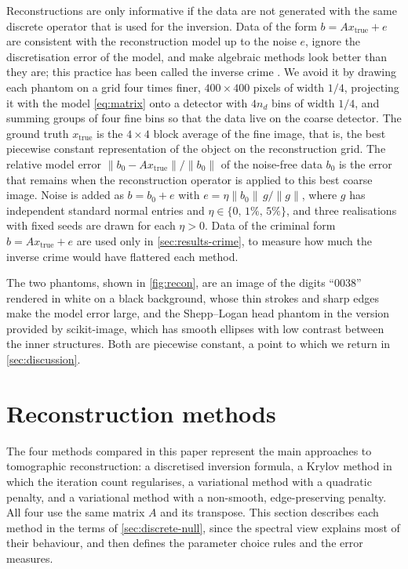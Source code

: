 \documentclass[11pt,a4paper]{article}
\numberwithin{equation}{section}
\theoremstyle{remark}
\newcommand{\xt}{x_{\mathrm{true}}}
\begin{document}
Reconstructions are only informative if the data are not generated with the same discrete operator that is used for the inversion. Data of the form $b=A\xt+e$ are consistent with the reconstruction model up to the noise $e$, ignore the discretisation error of the model, and make algebraic methods look better than they are; this practice has been called the inverse crime \citep{colton1998,kaipio2005}. We avoid it by drawing each phantom on a grid four times finer, $400\times400$ pixels of width $1/4$, projecting it with the model \eqref{eq:matrix} onto a detector with $4n_d$ bins of width $1/4$, and summing groups of four fine bins so that the data live on the coarse detector. The ground truth $\xt$ is the $4\times4$ block average of the fine image, that is, the best piecewise constant representation of the object on the reconstruction grid. The relative model error $\|b_0-A\xt\|/\|b_0\|$ of the noise-free data $b_0$ is the error that remains when the reconstruction operator is applied to this best coarse image. Noise is added as $b=b_0+e$ with $e=\eta\|b_0\|\,g/\|g\|$, where $g$ has independent standard normal entries and $\eta\in\{0,\,1\%,\,5\%\}$, and three realisations with fixed seeds are drawn for each $\eta>0$. Data of the criminal form $b=A\xt+e$ are used only in \cref{sec:results-crime}, to measure how much the inverse crime would have flattered each method.

The two phantoms, shown in \cref{fig:recon}, are an image of the digits ``0038'' rendered in white on a black background, whose thin strokes and sharp edges make the model error large, and the Shepp--Logan head phantom \citep{shepp1974} in the version provided by scikit-image, which has smooth ellipses with low contrast between the inner structures. Both are piecewise constant, a point to which we return in \cref{sec:discussion}.

\section{Reconstruction methods}\label{sec:methods}

The four methods compared in this paper represent the main approaches to tomographic reconstruction: a discretised inversion formula, a Krylov method in which the iteration count regularises, a variational method with a quadratic penalty, and a variational method with a non-smooth, edge-preserving penalty. All four use the same matrix $A$ and its transpose. This section describes each method in the terms of \cref{sec:discrete-null}, since the spectral view explains most of their behaviour, and then defines the parameter choice rules and the error measures.
\end{document}
